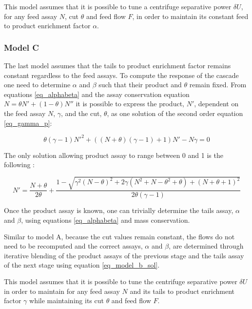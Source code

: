 
This model assumes that it is possible to tune a centrifuge separative power
$\delta U$, for any feed assay $N$, cut $\theta$ and feed flow $F$, in order to
maintain its constant feed to product enrichment factor $\alpha$.




\subsubsection{Model C}
The last model assumes that the tails to product enrichment factor remains
constant regardless to the feed assays. To compute the response of the cascade
one need to determine $\alpha$ and $\beta$ such that their product and
$\theta$ remain fixed.
From equations \eqref{eq_alphabeta} and the assay conservation equation $N =
\theta N' + (1-\theta)N''$ it is possible to express the product, $N'$,
dependent on the feed assay $N$, $\gamma$, and the cut, $\theta$, as one
solution of the second order equation \eqref{eq_gamma_p}:

\begin{equation}\label{eq_gamma_p}
    \theta(\gamma-1)N'^2+((N+\theta)(\gamma-1)+1)N'-N\gamma = 0
\end{equation}


The only solution allowing product assay to range between 0 and 1 is the
following :

\begin{equation}\label{eq_model_b_sol}
    N' = \frac{N+\theta}{2\theta} +
         \frac{1 - \sqrt{\gamma^{2}(N-\theta)^{2}
                         + 2\gamma( N^{2} + N - \theta^{2} + \theta)
                         + (N + \theta + 1)^{2}}}
              {2\theta(\gamma - 1)}
\end{equation}

Once the product assay is known, one can trivially determine the tails assay,
$\alpha$ and $\beta$, using equations \eqref{eq_alphabeta} and mass
conservation.

Similar to model A, because the cut values remain constant, the flows do not
need to be recomputed and the correct assays, $\alpha$ and $\beta$, are
determined through iterative blending of the product assays of the previous
stage and the tails assay of the next stage using equation
\eqref{eq_model_b_sol}.

This model assumes that it is possible to tune the centrifuge separative power
$\delta U$ in order to maintain for any feed assay $N$ and its tails to product
enrichment factor $\gamma$ while maintaining its cut $\theta$ and feed flow $F$.

